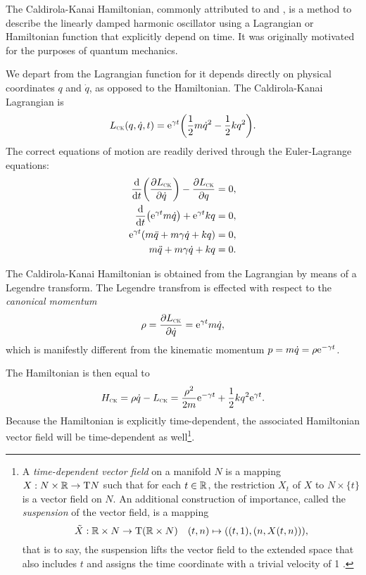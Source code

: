 The Caldirola-Kanai Hamiltonian, commonly attributed to \citet{Caldirola1941} and \citet{Kanai1948}, is a method to describe the linearly damped harmonic oscillator using a Lagrangian or Hamiltonian function that explicitly depend on time. It was originally motivated for the purposes of quantum mechanics.

We depart from the Lagrangian function for it depends directly on physical coordinates \(q\) and \(\dot{q}\), as opposed to the Hamiltonian. The Caldirola-Kanai Lagrangian is
\begin{equation}
    L_\text{\tiny{\textsc{CK}}}(q, \dot{q}, t) = \mathrm{e}^{\gamma t}\qty(\frac{1}{2}m\dot{q}^2 - \frac{1}{2}kq^2).
    \label{eq:lag_CK}
\end{equation}
The correct equations of motion are readily derived through the Euler-Lagrange equations:
\begin{equation}
    \begin{split}
        \dv{}{t}\qty(\pdv{\ensuremath{L_\text{\tiny{\textsc{CK}}}}}{\dot{q}}) - \pdv{\ensuremath{L_\text{\tiny{\textsc{CK}}}}}{q} &= 0, \\
        \dv{}{t}\qty(\mathrm{e}^{\gamma t } m \dot{q}) + \mathrm{e}^{\gamma t} kq &= 0, \\
        \mathrm{e}^{\gamma t } \qty(m\ddot{q} + m\gamma\dot{q} + kq)  &= 0, \\
        m\ddot{q} + m\gamma\dot{q} + kq &= 0. \\
    \end{split}
\end{equation}

The Caldirola-Kanai Hamiltonian is obtained from the Lagrangian by means of a Legendre transform. The Legendre transfrom is effected with respect to the \emph{canonical momentum}
\begin{equation}
     \rho = \pdv{\ensuremath{L_\text{\tiny{\textsc{CK}}}}}{\dot{q}} = \mathrm{e}^{\gamma t} m \dot{q},
\end{equation}
which is manifestly different from the kinematic momentum \(p = m\dot{q} = \rho \mathrm{e}^{-\gamma t}\).

The Hamiltonian is then equal to
\begin{equation}
     H_\text{\tiny{\textsc{CK}}} = \rho\dot{q} - L_\text{\tiny{\textsc{CK}}} =  \frac{\rho^2}{2m}\mathrm{e}^{-\gamma t} + \frac{1}{2}kq^2\mathrm{e}^{\gamma t}.
\end{equation}
Because the Hamiltonian is explicitly time-dependent, the associated Hamiltonian vector field will be time-dependent as well\footnote
{A \emph{time-dependent vector field} on a manifold \(N\) is a mapping \(X: N\times\mathbb{R} \to \mathrm{T}N\) such that for each \(t \in \mathbb{R}\), the restriction \(X_t\) of \(X\) to \(N \times \{t\}\) is a vector field on \(N\). \cite{Libermann1987} An additional construction of importance, called the \emph{suspension} of the vector field, is a mapping \begin{equation}
     \tilde{X}: \mathbb{R} \times N \to \mathrm{T}(\mathbb{R} \times N) \quad (t, n) \mapsto ((t, 1), (n, X(t, n))),
\end{equation} that is to say, the suspension lifts the vector field to the extended space that also includes \(t\) and assigns the time coordinate with a trivial velocity of 1 \cite{Abraham1978}.}.

